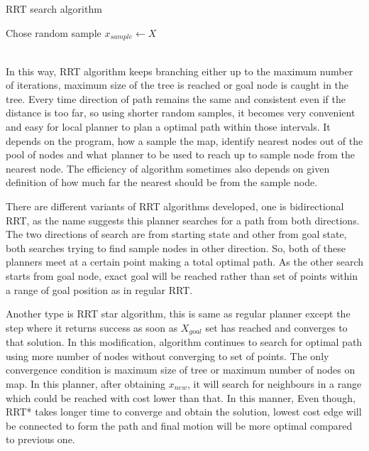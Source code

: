 \documentclass[12pt]{article}
\begin{document}
\begin{algorithm}[ht]
\caption{RRT search algorithm}
\begin{algorithmic}[1]
\State Chose random sample $x_{sample}  \longleftarrow  X$
 
\EndIf
{}
\;
\\
\EndIf
\EndIf
\EndWhile
\\
\end{algorithmic}
\end{algorithm}
In this way, RRT algorithm keeps branching either up to the maximum number of iterations, maximum size of the tree is reached or goal node is caught in the tree. Every time direction of path remains the same and consistent even if the distance is too far, so using shorter random samples, it becomes very convenient and easy for local planner to plan a optimal path within those intervals. It depends on the program, how a sample the map, identify nearest nodes out of the pool of nodes and what planner to be used to reach up to sample node from the nearest node. The efficiency of algorithm sometimes also depends on given definition of how much far the nearest should be from the sample node. 
\par \noindent
There are different variants of RRT algorithms developed, one is bidirectional RRT, as the name suggests this planner searches for a path from both directions. The two directions of search are from starting state and other from goal state, both searches trying to find sample nodes in other direction. So, both of these planners meet at a certain point making a total optimal path. As the other search starts from goal node, exact goal will be reached rather than set of points within a range of goal position as in regular RRT. 
\par \noindent
Another type is RRT star algorithm, this is same as regular planner except the step where it returns success as soon as $X_{goal}$ set has reached and converges to that solution. In this modification, algorithm continues to search for optimal path using more number of nodes without converging to set of points. The only convergence condition is maximum size of tree or maximum number of nodes on map. In this planner, after obtaining $x_{new}$, it will search for neighbours in a range which could be reached with cost lower than that. In this manner, Even though, RRT* takes longer time to converge and obtain the solution, lowest cost edge will be connected to form the path and final motion will be more optimal compared to previous one. 
\end{document}
